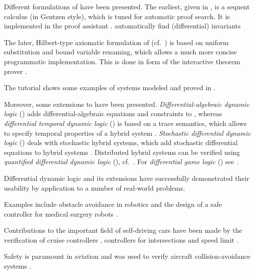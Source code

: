    Different formulations of \dL have been presented.
    The earliest, given in \cite{Platzer10HybridSystems}, is a sequent calculus (in Gentzen style), which is tuned for automatic proof search. It is implemented in the proof assistant \KeYmaera.
    automatically find (differential) invariants

    The later, Hilbert-type axiomatic formulation of \dL (cf.~\cite{Platzer15Uniform,Platzer12Complete,Platzer12LogicsDynSys}) is based on uniform substitution and bound variable renaming, which allows a much more concise programmatic implementation. This is done in form of the interactive theorem prover \KeYmaeraX.

    The tutorial \cite{Quesel16Tutorial} shows some examples of systems modeled and proved in \dL.

    Moreover, some extensions to \dL have been presented.
    \emph{Differential-algebraic dynamic logic} (\DAL) adds differential-algebraic equations and constraints to \dL \cite{Platzer10DAL}, whereas
    \emph{differential temporal dynamic logic} (\dTL) is based on a trace semantics, which allows to specify temporal properties of a hybrid system \cite{Platzer07dTL}.
    \emph{Stochastic differential dynamic logic} (\SdL) deals with stochastic hybrid systems, which add stochastic differential equations to hybrid systems \cite{Platzer11StochasticHP}.
    Distributed hybrid systems can be verified using \emph{quantified differential dynamic logic} (\QdL), cf.~\cite{Platzer10QdL}.
    For \emph{differential game logic} (\dGL) see \cite{Platzer15GameLogic}.
    
    Differential dynamic logic and its extensions have successfully demonstrated their usability by application to a number of real-world problems.
    
    Examples include obstacle avoidance in robotics \cite{Mitsch16Robots} and the design of a safe controller for medical surgery robots \cite{Kouskoulas13SurgicalRobot}.
    
    Contributions to the important field of self-driving cars have been made by the verification of cruise controllers \cite{Loos11CruiseControl,Loos13CruiseControllers}, controllers for intersections \cite{Loos11Intersections} and speed limit \cite{Mitsch12SpeedControl}.
    
    Safety is paramount in aviation \cite{GhorbalAerospace} and \KeYmaera was used to verify aircraft collision-avoidance systems \cite{Jeannin15ACASX,Jeannin15CollisonAvoidance,Loos13Aircraft}.
    

